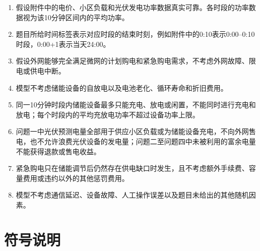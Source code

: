 \documentclass[UTF8]{ctexart}
\begin{document}
    \begin{enumerate}
        \item 假设附件中的电价、小区负载和光伏发电功率数据真实可靠。各时段的功率数据视为该10分钟区间内的平均功率。
        
        \item 题目所给时间标签表示对应时段的结束时刻，例如附件中的0:10表示0:00--0:10时段，0:00+1表示当天24:00。
        
        \item 假设外网能够完全满足微网的计划购电和紧急购电需求，不考虑外网故障、限电或供电中断。
        \item 模型不考虑储能设备的自放电以及电池老化、循环寿命和折旧费用。
        
        \item 同一10分钟时段内储能设备最多只能充电、放电或闲置，不能同时进行充电和放电；每个时段内的平均充放电功率不超过设备功率上限。
        
        \item 问题一中光伏预测电量全部用于供应小区负载或为储能设备充电，不向外网售电，也不允许浪费光伏设备的发电量；问题二至问题四中未被利用的富余电量不能获得退款或售电收益。
        
        \item 紧急购电只在储能调节后仍然存在供电缺口时发生，且不考虑额外手续费、容量费用或违约以外的其他惩罚费用。
        
        \item 模型不考虑通信延迟、设备故障、人工操作误差以及题目未给出的其他随机因素。
    \end{enumerate}
    
    \clearpage
    
    \section{符号说明}
    
\end{document}
